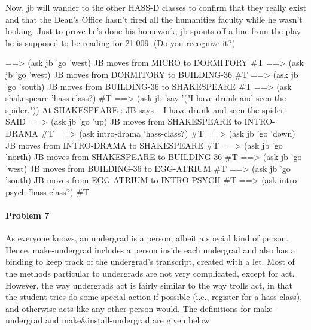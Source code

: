 Now, {\cf jb} will wander to the other HASS-D classes to confirm that
they really exist and that the Dean's Office hasn't fired all the
humanities faculty while he wasn't looking.  Just to prove he's done
his homework, {\cf jb} spouts off a line from the play he is supposed
to be reading for 21.009.  (Do you recognize it?)

\beginlisp
==> (ask jb 'go 'west)
JB moves from MICRO to DORMITORY 
\#T
\null
==> (ask jb 'go 'west)
JB moves from DORMITORY to BUILDING-36 
\#T
\null
==> (ask jb 'go 'south)
JB moves from BUILDING-36 to SHAKESPEARE 
\#T
\null
==> (ask shakespeare 'hass-class?)
\#T
\null
==> (ask jb 'say '("I have drunk and seen the spider."))
At SHAKESPEARE : JB says -- I have drunk and seen the spider. 
SAID
\null
\endlisp
\beginlisp
==> (ask jb 'go 'up)
JB moves from SHAKESPEARE to INTRO-DRAMA 
\#T
\null
==> (ask intro-drama 'hass-class?)
\#T
\null
==> (ask jb 'go 'down)
JB moves from INTRO-DRAMA to SHAKESPEARE 
\#T
\null
==> (ask jb 'go 'north)
JB moves from SHAKESPEARE to BUILDING-36 
\#T
\null
==> (ask jb 'go 'west)
JB moves from BUILDING-36 to EGG-ATRIUM 
\#T
\null
\endlisp
\beginlisp
==> (ask jb 'go 'south)
JB moves from EGG-ATRIUM to INTRO-PSYCH 
\#T
\null
==> (ask intro-psych 'hass-class?)
\#T
\endlisp

\newpage

\paragraph{Problem 7}

As everyone knows, an undergrad is a person, albeit a special
kind of person.  Hence, {\cf make-undergrad} includes a person inside
each undergrad and also has a binding to keep track of the
undergrad's transcript, created with a {\cf let}.  Most of the methods
particular to undergrads are not very complicated, except for {\cf
act}.  However, the way undergrads {\cf 
act} is fairly similar to the way trolls {\cf act}, in that the
student tries do some special action if possible (i.e., register for a
{\cf hass-class}), and otherwise acts like any other person would.
The definitions for {\cf make-undergrad} and {\cf
make\&install-undergrad} are given below

